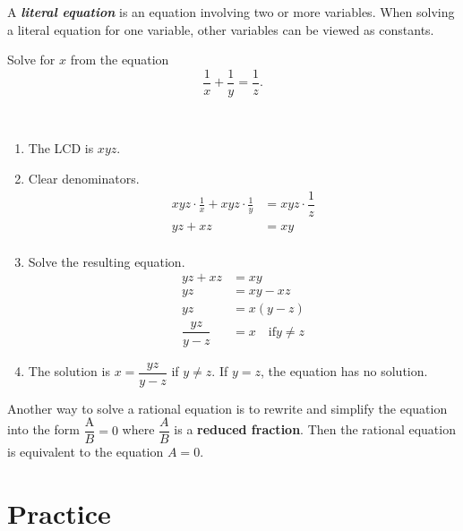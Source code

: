 \documentclass[
  en,11pt]{elegantbook}
\newcommand{\size}[2]{{\fontsize{#1}{0}\selectfont#2}}
\newenvironment{rmdnote}{
	\vspace*{0.5\baselineskip}
    \par\noindent
    \makebox[-3pt][r]{\color{red!90}\size{8}{\textdbend}\,\,}
    \begin{tcolorbox}[
    title={\textbf{\color{second}Note}},
    title style={left color=blue!10!green!20!white,right color=yellow!20!blue!20!white},
    colback=red!10!white,
    ]
    \itshape
}{
    \end{tcolorbox}
    \par\ignorespacesafterend
}
\let\BeginKnitrBlock\begin \let\EndKnitrBlock\end
\begin{document}
A \textbf{\emph{literal equation}} is an equation involving two or more variables. When solving a literal equation for one variable, other variables can be viewed as constants.

\BeginKnitrBlock{example}
\protect\hypertarget{exm:unnamed-chunk-145}{}{\label{exm:unnamed-chunk-145} }
Solve for \(x\) from the equation
\[
\frac{1}{x}+\frac{1}{y}=\dfrac{1}{z}.
\]
\EndKnitrBlock{example}

\BeginKnitrBlock{solution}
{}\\

\begin{enumerate}
\def\labelenumi{\arabic{enumi}.}

\item
  The LCD is \(xyz\).
\item
  Clear denominators.
  \[
       \begin{aligned}
           xyz\cdot\frac{1}{x}+xyz\cdot\frac{1}{y}&=xyz\cdot\dfrac{1}{z}\\
           yz+xz&=xy\\
       \end{aligned}
   \]
\item
  Solve the resulting equation.
  \[
       \begin{aligned}
           yz+xz&=xy\\
           yz&=xy-xz\\
           yz&=x(y-z)\\
           \dfrac{yz}{y-z}&=x \quad \text{if} y\neq z
       \end{aligned}
   \]
\item
  The solution is \(x=\dfrac{yz}{y-z}\) if \(y\neq z\). If \(y=z\), the equation has no solution.
\end{enumerate}
\EndKnitrBlock{solution}

\begin{rmdnote}

Another way to solve a rational equation is to rewrite and simplify the equation into the form \(\dfrac{\text{A}}{B}=0\) where \(\dfrac{A}{B}\) is a \textbf{reduced fraction}. Then the rational equation is equivalent to the equation \(A=0\).

\end{rmdnote}

\newpage

\hypertarget{practice-6}{%
\section{Practice}\label{practice-6}}
\end{document}
